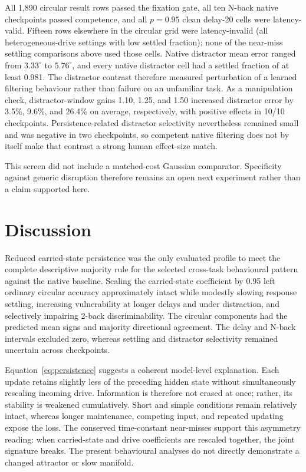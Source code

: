 \documentclass[11pt,reprint,aps,prl,floatfix,secnumarabic]{revtex4-2}
\begin{document}
All 1,890 circular result rows passed the fixation gate, all ten N-back native
checkpoints passed competence, and all $p=0.95$ clean delay-20 cells were
latency-valid. Fifteen rows elsewhere in the circular grid were latency-invalid
(all heterogeneous-drive settings with low settled fraction); none of the
near-miss settling comparisons above used those cells. Native distractor mean
error ranged from $3.33^\circ$ to $5.76^\circ$, and every native distractor cell
had a settled fraction of at least 0.981. The distractor contrast therefore measured
perturbation of a learned filtering behaviour rather than failure on an
unfamiliar task. As a manipulation check, distractor-window gains 1.10, 1.25,
and 1.50 increased distractor error by 3.5\%, 9.6\%, and 26.4\% on average,
respectively, with positive effects in 10/10 checkpoints. Persistence-related
distractor selectivity nevertheless remained small and was negative in two
checkpoints, so competent native filtering does not by itself make that contrast
a strong human effect-size match.

This screen did not include a matched-cost Gaussian comparator. Specificity
against generic disruption therefore remains an open next experiment rather
than a claim supported here.

\section{Discussion}

Reduced carried-state persistence was the only evaluated profile to meet the
complete descriptive majority rule for the selected cross-task behavioural
pattern against the native baseline. Scaling the carried-state coefficient by
0.95 left ordinary circular accuracy approximately intact while modestly
slowing response settling, increasing vulnerability at longer delays and under
distraction, and selectively impairing 2-back discriminability. The circular
components had the predicted mean signs and majority directional agreement.
The delay and N-back intervals excluded zero, whereas settling and distractor
selectivity remained uncertain across checkpoints.

Equation~\ref{eq:persistence} suggests a coherent model-level explanation.
Each update retains slightly less of the preceding hidden state without
simultaneously rescaling incoming drive. Information is therefore not erased
at once; rather, its stability is weakened cumulatively. Short and simple
conditions remain relatively intact, whereas longer maintenance, competing
input, and repeated updating expose the loss. The conserved time-constant
near-misses support this asymmetry reading: when carried-state and drive
coefficients are rescaled together, the joint signature breaks. The present
behavioural analyses do not directly demonstrate a changed attractor or slow
manifold.
\end{document}
